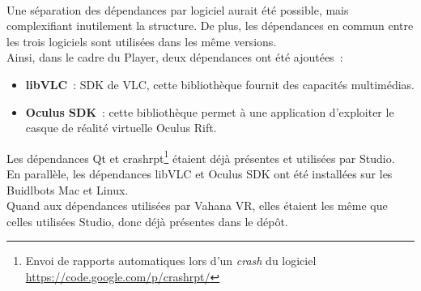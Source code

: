 \ \\
Une séparation
des dépendances par logiciel aurait été possible, mais complexifiant inutilement 
la structure. De plus, les dépendances en commun entre les trois logiciels
sont utilisées dans les même versions. \\
\newline
Ainsi, dans le cadre du Player, deux dépendances ont été ajoutées~:
\begin{itemize}
  \item \textbf{libVLC}~: SDK de VLC, cette bibliothèque fournit des capacités multimédias.\cite{libvlc}
  \item \textbf{Oculus SDK}~: cette bibliothèque permet à une application d'exploiter le 
  casque de réalité virtuelle Oculus Rift.\cite{oculus-developer-guide}
\end{itemize}
Les dépendances Qt et crashrpt\footnote{Envoi de rapports automatiques lors d'un
\textit{crash} du logiciel \url{https://code.google.com/p/crashrpt/}} étaient déjà 
présentes et utilisées par Studio.\\
En parallèle, les dépendances libVLC et Oculus SDK ont été installées sur les Buidlbots Mac et Linux.\\
Quand aux dépendances utilisées par Vahana VR, elles étaient les même que celles 
utilisées Studio, donc déjà présentes dans le dépôt.\\

